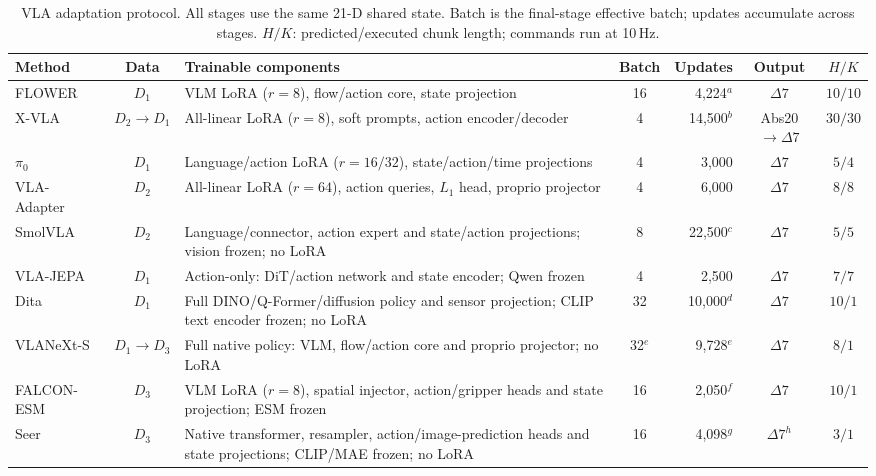 \begin{table}[!ht]
\centering\footnotesize
\caption{VLA adaptation protocol. All stages use the same 21-D shared state.
Batch is the final-stage effective batch; updates accumulate across stages.
$H/K$: predicted/executed chunk length; commands run at 10\,Hz.}
\label{tab:vla_adaptation}
\begin{tabularx}{\linewidth}{@{}l c Y c r c c@{}}
\toprule
Method & Data & Trainable components & Batch & Updates & Output & $H/K$\\
\midrule
FLOWER~\cite{reuss2025flower} & $D_1$ & VLM LoRA ($r=8$), flow/action core, state projection & 16 & 4,224$^a$ & $\Delta7$ & $10/10$\\
X-VLA~\cite{zheng2026xvla} & $D_2\!\to\!D_1$ & All-linear LoRA ($r=8$), soft prompts, action encoder/decoder & 4 & 14,500$^b$ & Abs20$\to\Delta7$ & $30/30$\\
$\pi_0$~\cite{black2025pi0} & $D_1$ & Language/action LoRA ($r=16/32$), state/action/time projections & 4 & 3,000 & $\Delta7$ & $5/4$\\
VLA-Adapter~\cite{wang2026vla} & $D_2$ & All-linear LoRA ($r=64$), action queries, $L_1$ head, proprio projector & 4 & 6,000 & $\Delta7$ & $8/8$\\
SmolVLA~\cite{shukor2025smolvla} & $D_2$ & Language/connector, action expert and state/action projections; vision frozen; no LoRA & 8 & 22,500$^c$ & $\Delta7$ & $5/5$\\
VLA-JEPA~\cite{sun2026vla} & $D_1$ & Action-only: DiT/action network and state encoder; Qwen frozen & 4 & 2,500 & $\Delta7$ & $7/7$\\
Dita~\cite{hou2025dita} & $D_1$ & Full DINO/Q-Former/diffusion policy and sensor projection; CLIP text encoder frozen; no LoRA & 32 & 10,000$^d$ & $\Delta7$ & $10/1$\\
VLANeXt-S~\cite{wu2026vlanext,wu2026vlanextfamily} & $D_1\!\to\!D_3$ & Full native policy: VLM, flow/action core and proprio projector; no LoRA & 32$^e$ & 9,728$^e$ & $\Delta7$ & $8/1$\\
FALCON-ESM~\cite{zhang2026falcon} & $D_3$ & VLM LoRA ($r=8$), spatial injector, action/gripper heads and state projection; ESM frozen & 16 & 2,050$^f$ & $\Delta7$ & $10/1$\\
Seer~\cite{tian2025seer} & $D_3$ & Native transformer, resampler, action/image-prediction heads and state projections; CLIP/MAE frozen; no LoRA & 16 & 4,098$^g$ & $\Delta7^h$ & $3/1$\\
\bottomrule
\end{tabularx}

\end{table}
